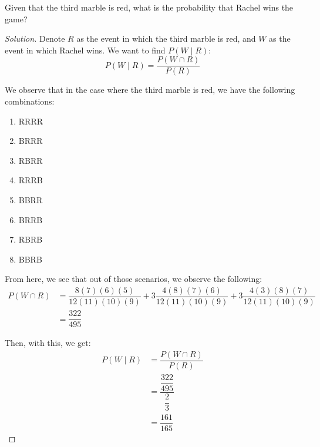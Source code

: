 \documentclass{article}
\newenvironment{solution}{\begin{proof}[Solution]}{\end{proof}}
\begin{document}
\begin{hw}
	Given that the third marble is red, what is the probability that Rachel wins the game?
\end{hw}
\begin{solution}
	Denote $R$ as the event in which the third marble is red, and $W$ as the event in which Rachel wins. We want to find $P(W \mid R)$:
	\begin{equation*}
		P(W \mid R) = \dfrac{P(W \cap R)}{P(R)}
	\end{equation*}
	
	We observe that in the case where the third marble is red, we have the following combinations:
	\begin{enumerate}
		\item RRRR
		\item BRRR
		\item RBRR
		\item RRRB
		\item BBRR
		\item BRRB
		\item RBRB
		\item BBRB
	\end{enumerate}

	From here, we see that out of those scenarios, we observe the following:
	\begin{align*}
		P(W \cap R) &= \dfrac{8(7)(6)(5)}{12(11)(10)(9)} + 3\dfrac{4(8)(7)(6)}{12(11)(10)(9)} + 3\dfrac{4(3)(8)(7)}{12(11)(10)(9)} \\
		&= \dfrac{322}{495}
	\end{align*}

	Then, with this, we get:
	\begin{align*}
		P(W \mid R) &= \dfrac{P(W \cap R)}{P(R)} \\
		&= \dfrac{\dfrac{322}{495}}{\dfrac{2}{3}} \\
		&= \dfrac{161}{165}
	\end{align*}
\end{solution}

\newpage
\end{document}
